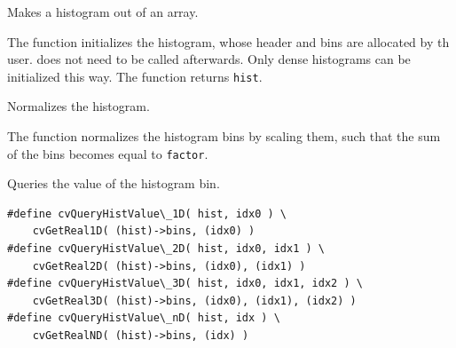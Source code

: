 \ifC %
Makes a histogram out of an array.


\begin{description}
\end{description}

The function initializes the histogram, whose header and bins are allocated by th user.  does not need to be called afterwards. Only dense histograms can be initialized this way. The function returns \texttt{hist}.
\fi %

Normalizes the histogram.


\begin{description}
\end{description}

The function normalizes the histogram bins by scaling them, such that the sum of the bins becomes equal to \texttt{factor}.

Queries the value of the histogram bin.

\begin{lstlisting}
#define cvQueryHistValue\_1D( hist, idx0 ) \
    cvGetReal1D( (hist)->bins, (idx0) )
#define cvQueryHistValue\_2D( hist, idx0, idx1 ) \
    cvGetReal2D( (hist)->bins, (idx0), (idx1) )
#define cvQueryHistValue\_3D( hist, idx0, idx1, idx2 ) \
    cvGetReal3D( (hist)->bins, (idx0), (idx1), (idx2) )
#define cvQueryHistValue\_nD( hist, idx ) \
    cvGetRealND( (hist)->bins, (idx) )
\end{lstlisting}

